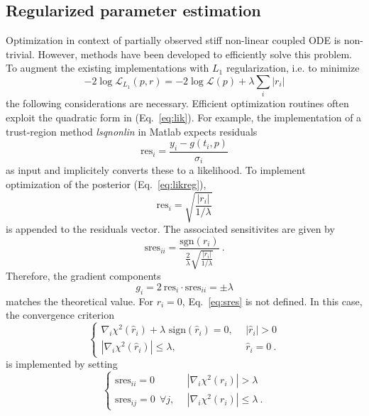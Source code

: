 \documentclass{bioinfo}
\begin{document}
\subsection{Regularized parameter estimation}
Optimization in context of partially observed stiff non-linear coupled ODE is non-trivial.
However, methods have been developed to efficiently solve this problem.
To augment the existing implementations with $L_1$ regularization, i.e. to minimize
\begin{equation}
	-2\log \mathcal L_{L_1}(p,r) = -2\log \mathcal L(p) + \lambda \sum_i |r_i|
\end{equation}
the following considerations are necessary.
Efficient optimization routines often exploit the quadratic form in (Eq.~\ref{eq:lik}).
For example, the implementation of a trust-region method \textit{lsqnonlin} in Matlab expects residuals
\begin{equation}
	\text{res}_i = \frac{y_i-g(t_i,p)}{\sigma_i}
\end{equation}
as input and implicitely converts these to a likelihood.
To implement optimization of the posterior (Eq.~\ref{eq:likreg}),
\begin{equation}
	\text{res}_i = \sqrt{\frac{|r_i|}{1/\lambda}}
\end{equation}
is appended to the residuals vector.
The associated sensitivites are given by
\begin{equation}
	\text{sres}_{ii} = \frac{\text{sgn}(r_i)}{\frac{2}{\lambda}\sqrt{\frac{|r_i|}{1/\lambda}}} \:.\label{eq:sres}
\end{equation}
Therefore, the gradient components
\begin{equation}
	g_i = 2 \: \text{res}_i \cdot \text{sres}_{ii} = \pm \lambda
\end{equation}
matches the theoretical value.
For $r_i = 0$, Eq.~\ref{eq:sres} is not defined.
In this case, the convergence criterion
\begin{equation}
	\begin{cases}
	\nabla_i \chi^2(\hat r_i) + \lambda \text{ sign}(\hat r_i) = 0, \:\:& |\hat r_i| > 0\\
	|\nabla_i \chi^2(\hat r_i)| \le \lambda, \:\:&\hat r_i = 0 \:.
	\end{cases}
	\label{eq:convcrit}
\end{equation}
is implemented by setting
\begin{equation}
	\begin{cases}
	\text{sres}_{ii}=0&|\nabla_i \chi^2(r_i)| > \lambda\\
	\text{sres}_{ij}=0\:\:\forall j, \:\:&|\nabla_i \chi^2(r_i)| \le \lambda \:.
	\end{cases}
	\label{eq:sresset}
\end{equation}
\end{document}

